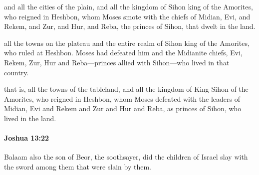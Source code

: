 			\begin{versebox}
					\item[BHS] 
					\item[ASV] and all the cities of the plain, and all the kingdom of Sihon king of the Amorites, who reigned in Heshbon, whom Moses smote with the chiefs of Midian, Evi, and Rekem, and Zur, and Hur, and Reba, the princes of Sihon, that dwelt in the land.
					\item[NIV] all the towns on the plateau and the entire realm of Sihon king of the Amorites, who ruled at Heshbon. Moses had defeated him and the Midianite chiefs, Evi, Rekem, Zur, Hur and Reba—princes allied with Sihon—who lived in that country.
					\item[NRSV] that is, all the towns of the tableland, and all the kingdom of King Sihon of the Amorites, who reigned in Heshbon, whom Moses defeated with the leaders of Midian, Evi and Rekem and Zur and Hur and Reba, as princes of Sihon, who lived in the land.
			\end{versebox}

		\paragraph{Joshua 13:22} %
			\label{JOSHUA-13-22}

			Balaam also the son of Beor, the soothsayer, did the children of Israel slay with the sword among them that were slain by them.

